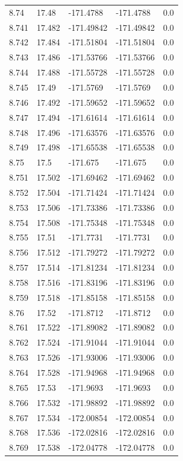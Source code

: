\begin{tabular}{lllll}
8.74 & 17.48 & -171.4788 & -171.4788 & 0.0 \\
8.741 & 17.482 & -171.49842 & -171.49842 & 0.0 \\
8.742 & 17.484 & -171.51804 & -171.51804 & 0.0 \\
8.743 & 17.486 & -171.53766 & -171.53766 & 0.0 \\
8.744 & 17.488 & -171.55728 & -171.55728 & 0.0 \\
8.745 & 17.49 & -171.5769 & -171.5769 & 0.0 \\
8.746 & 17.492 & -171.59652 & -171.59652 & 0.0 \\
8.747 & 17.494 & -171.61614 & -171.61614 & 0.0 \\
8.748 & 17.496 & -171.63576 & -171.63576 & 0.0 \\
8.749 & 17.498 & -171.65538 & -171.65538 & 0.0 \\
8.75 & 17.5 & -171.675 & -171.675 & 0.0 \\
8.751 & 17.502 & -171.69462 & -171.69462 & 0.0 \\
8.752 & 17.504 & -171.71424 & -171.71424 & 0.0 \\
8.753 & 17.506 & -171.73386 & -171.73386 & 0.0 \\
8.754 & 17.508 & -171.75348 & -171.75348 & 0.0 \\
8.755 & 17.51 & -171.7731 & -171.7731 & 0.0 \\
8.756 & 17.512 & -171.79272 & -171.79272 & 0.0 \\
8.757 & 17.514 & -171.81234 & -171.81234 & 0.0 \\
8.758 & 17.516 & -171.83196 & -171.83196 & 0.0 \\
8.759 & 17.518 & -171.85158 & -171.85158 & 0.0 \\
8.76 & 17.52 & -171.8712 & -171.8712 & 0.0 \\
8.761 & 17.522 & -171.89082 & -171.89082 & 0.0 \\
8.762 & 17.524 & -171.91044 & -171.91044 & 0.0 \\
8.763 & 17.526 & -171.93006 & -171.93006 & 0.0 \\
8.764 & 17.528 & -171.94968 & -171.94968 & 0.0 \\
8.765 & 17.53 & -171.9693 & -171.9693 & 0.0 \\
8.766 & 17.532 & -171.98892 & -171.98892 & 0.0 \\
8.767 & 17.534 & -172.00854 & -172.00854 & 0.0 \\
8.768 & 17.536 & -172.02816 & -172.02816 & 0.0 \\
8.769 & 17.538 & -172.04778 & -172.04778 & 0.0 \\

\end{tabular}
